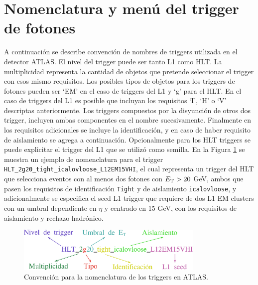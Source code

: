\section{Nomenclatura y menú del trigger de fotones}




A continuación se describe convención de nombres de triggers utilizada en el detector ATLAS.
El nivel del trigger puede ser tanto L1 como HLT. La multiplicidad representa la cantidad de objetos que pretende seleccionar el trigger con esos mismo requisitos. Los posibles tipos de objetos para los triggers de fotones pueden ser `EM' en el caso de triggers del L1 y `g' para el HLT. En el caso de triggers del L1 es posible que incluyan los requisitos `I', `H' o `V' descriptas anteriormente. Los triggers compuestos por la disyunción de otros dos trigger, incluyen ambas componentes en el nombre sucesivamente. Finalmente en los requisitos adicionales se incluye la identificación, y en caso de haber requisito de aislamiento se agrega a continuación. Opcionalmente para los HLT triggers se puede explicitar el trigger del L1 que se utilizó como semilla. En la Figura \ref{fig:trigger_name} se muestra un ejemplo de nomenclatura para el trigger \texttt{HLT\_2g20\_tight\_icalovloose\_L12EM15VHI}, el cual representa un trigger del HLT que selecciona eventos con al menos dos fotones con $E_{\text{T}}>20$ GeV, ambos que pasen los requisitos de identificación \texttt{Tight} y de aislamiento \texttt{icalovloose}, y adicionalmente se especifica el seed L1 trigger que requiere de dos L1 EM clusters con un umbral dependiente en $\eta$ y centrado en 15 GeV, con los requisitos de aislamiento y rechazo hadrónico.

\begin{figure}
  \centering
  \includegraphics[width=0.8\textwidth]{images/trigger/trigger_name.pdf}
  \caption{Convención para la nomenclatura de los triggers en ATLAS.}
  \label{fig:trigger_name}
\end{figure}

